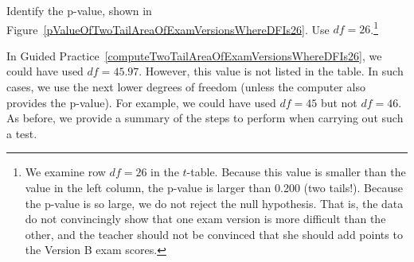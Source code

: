 \textA{\newpage}

\begin{exercise} \label{computeTwoTailAreaOfExamVersionsWhereDFIs26}
Identify the p-value, shown in Figure~\ref{pValueOfTwoTailAreaOfExamVersionsWhereDFIs26}. Use $df=26$.\footnote{We examine row $df=26$ in the $t$-table. Because this value is smaller than the value in the left column, the p-value is larger than 0.200 (two tails!). Because the p-value is so large, we do not reject the null hypothesis. That is, the data do not convincingly show that one exam version is more difficult than the other, and the teacher should not be convinced that she should add points to the Version B exam scores.}


\end{exercise}

In Guided Practice~\ref{computeTwoTailAreaOfExamVersionsWhereDFIs26}, we could have used $df=45.97$. However, this value is not listed in the table. In such cases, we use the next lower degrees of freedom (unless the computer also provides the p-value). For example, we could have used $df=45$ but not $df=46$.
As before, we provide a summary of the steps to perform when carrying out such a test.


